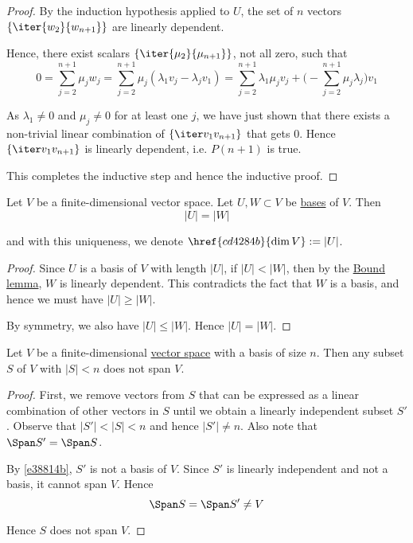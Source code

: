 \begin{proof}
  By the induction hypothesis applied to $U$, the set of $n$ vectors
  $\{\iter{w_2}{w_{n+1}}\}$ are linearly dependent.

  Hence, there exist scalars $\{\iter{\mu_2}{\mu_{n+1}}\}$, not all zero, such
  that
  \begin{equation*}
    0 =\sum_{j=2}^{n+1}\mu_jw_j
    =\sum_{j=2}^{n+1}\mu_j(\lambda_1v_j-\lambda_jv_1)
    =\sum_{j=2}^{n+1}\lambda_1\mu_jv_j+\biggl(-\sum_{j=2}^{n+1}\mu_j\lambda_j\biggr)v_1
  \end{equation*}

  As $\lambda_1\neq0$ and $\mu_j\neq0$ for at least one $j$, we have just shown
  that there exists a non-trivial linear combination of $\V$ that gets 0. Hence
  $\V$ is linearly dependent, i.e. $P(n+1)$ is true.

  This completes the inductive step and hence the inductive proof.
\end{proof}

\label{e38814b}

Let $V$ be a finite-dimensional vector space. Let $U,W\subset V$ be
\href{db2477b}{bases} of $V$. Then
$$
  |U|=|W|
$$

and with this uniqueness, we denote $\href{cd4284b}{\dim V}:=|U|$.

\begin{proof}
  Since $U$ is a basis of $V$ with length $|U|$, if $|U|<|W|$, then by the
  \href{e054922}{Bound lemma}, $W$ is linearly dependent. This contradicts the
  fact that $W$ is a basis, and hence we must have $|U|\geq |W|$.

  By symmetry, we also have $|U|\leq |W|$. Hence $|U|=|W|$.
\end{proof}

\label{b0af3c1}

Let $V$ be a finite-dimensional \href{fc83050}{vector space} with a basis of
size $n$. Then any subset $S$ of $V$ with $|S|<n$ does not span $V$.

\begin{proof}
  First, we remove vectors from $S$ that can be expressed as a linear
  combination of other vectors in $S$ until we obtain a linearly independent
  subset $S'$. Observe that $|S'|<|S|<n$ and hence $|S'|\neq n$. Also note that
  $\Span S'=\Span S$.

  By \autoref{e38814b}, $S'$ is not a basis of $V$. Since $S'$ is linearly
  independent and not a basis, it cannot span $V$. Hence
  $$
    \Span S=\Span S'\neq V
  $$

  Hence $S$ does not span $V$.
\end{proof}


